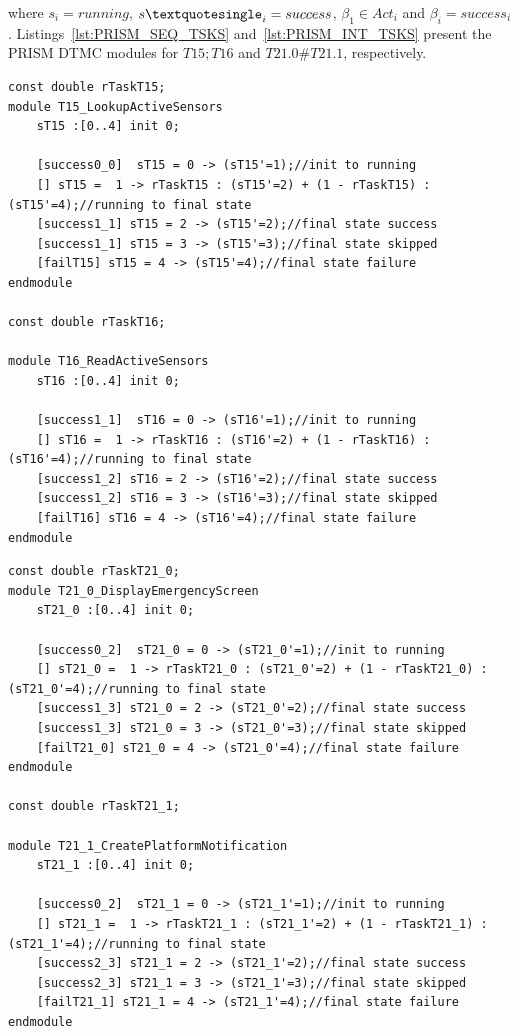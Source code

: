 \noindent
where $s_i = running$, $ s\textquotesingle_i = success$, $\beta_1 \in Act_i$  and $\beta_i = success_i$. Listings~\ref{lst:PRISM_SEQ_TSKS} and~\ref{lst:PRISM_INT_TSKS} present the PRISM DTMC modules for $T15;T16$ and $T21.0\#T21.1$, respectively.
\medskip

\begin{lstlisting}[language=Prism, caption={Sequential tasks T15 and T16 as DTMC modules with final transitions of the first module synchronized to the initial transition of the second.},label={lst:PRISM_SEQ_TSKS}] 
const double rTaskT15;
module T15_LookupActiveSensors
	sT15 :[0..4] init 0;
	
	[success0_0]  sT15 = 0 -> (sT15'=1);//init to running	
	[] sT15 =  1 -> rTaskT15 : (sT15'=2) + (1 - rTaskT15) : (sT15'=4);//running to final state
	[success1_1] sT15 = 2 -> (sT15'=2);//final state success
	[success1_1] sT15 = 3 -> (sT15'=3);//final state skipped
	[failT15] sT15 = 4 -> (sT15'=4);//final state failure
endmodule

const double rTaskT16;

module T16_ReadActiveSensors
	sT16 :[0..4] init 0;
	
	[success1_1]  sT16 = 0 -> (sT16'=1);//init to running	
	[] sT16 =  1 -> rTaskT16 : (sT16'=2) + (1 - rTaskT16) : (sT16'=4);//running to final state
	[success1_2] sT16 = 2 -> (sT16'=2);//final state success
	[success1_2] sT16 = 3 -> (sT16'=3);//final state skipped
	[failT16] sT16 = 4 -> (sT16'=4);//final state failure
endmodule
\end{lstlisting}

\begin{lstlisting}[language=Prism, caption={Interleaved tasks T21.0 and T21.1 as DTMC modules with initial transition synchronize and running transition interleaved.},label={lst:PRISM_INT_TSKS}] 
const double rTaskT21_0;
module T21_0_DisplayEmergencyScreen
	sT21_0 :[0..4] init 0;
	
	[success0_2]  sT21_0 = 0 -> (sT21_0'=1);//init to running	
	[] sT21_0 =  1 -> rTaskT21_0 : (sT21_0'=2) + (1 - rTaskT21_0) : (sT21_0'=4);//running to final state
	[success1_3] sT21_0 = 2 -> (sT21_0'=2);//final state success
	[success1_3] sT21_0 = 3 -> (sT21_0'=3);//final state skipped
	[failT21_0] sT21_0 = 4 -> (sT21_0'=4);//final state failure
endmodule

const double rTaskT21_1;

module T21_1_CreatePlatformNotification
	sT21_1 :[0..4] init 0;
	
	[success0_2]  sT21_1 = 0 -> (sT21_1'=1);//init to running
	[] sT21_1 =  1 -> rTaskT21_1 : (sT21_1'=2) + (1 - rTaskT21_1) : (sT21_1'=4);//running to final state
	[success2_3] sT21_1 = 2 -> (sT21_1'=2);//final state success
	[success2_3] sT21_1 = 3 -> (sT21_1'=3);//final state skipped
	[failT21_1] sT21_1 = 4 -> (sT21_1'=4);//final state failure
endmodule
\end{lstlisting}


